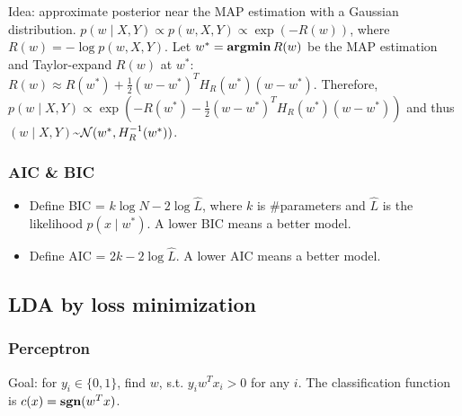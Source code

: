 Idea: approximate posterior near the MAP estimation with a Gaussian distribution.
$p(w\mid X, Y) \propto p(w, X, Y) \propto \exp(-R(w))$, where $R(w) = -\log p(w, X, Y)$. Let $w^* = \operatorname{\textbf{argmin}} R(w)$ be the MAP estimation and Taylor-expand $R(w)$ at $w^*$: $R(w) \approx R(w^*) + \frac{1}{2}(w-w^*)^T H_R(w^*) (w-w^*)$. Therefore, $p(w\mid X,Y)\propto \exp(-R(w^*) -\frac{1}{2}(w-w^*)^T H_R(w^*) (w-w^*))$ and thus $(w\mid X,Y) $\textasciitilde$ \mathcal{N}(w^*, H_R^{-1}(w^*))$.

\subsubsection*{AIC \& BIC}

\begin{itemize}
    \item Define BIC = $k\log N -2\log \hat{L}$, where $k$ is \#parameters and $\hat{L}$ is the likelihood $p(x\mid w^*)$. A lower BIC means a better model.
    \item Define AIC = $2k-2\log \hat{L}$. A lower AIC means a better model.
\end{itemize}

\subsection*{LDA by loss minimization}

\subsubsection*{Perceptron}

Goal: for $y_i\in\{0,1\}$, find $w$, s.t. $y_i w^T x_i >0$ for any $i$. The classification function is $c(x) = \operatorname{\textbf{sgn}}(w^T x)$.

